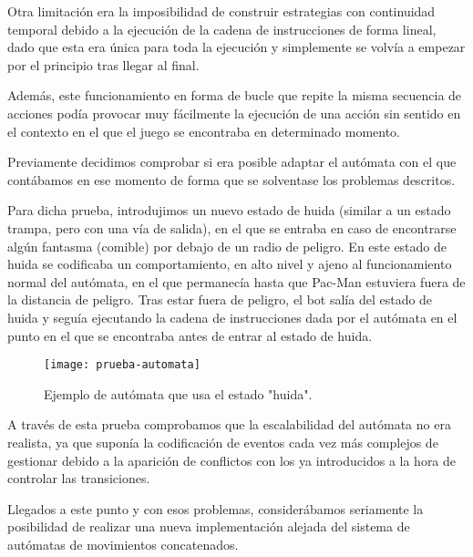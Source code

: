 Otra limitación era la imposibilidad de construir estrategias con continuidad temporal debido a la ejecución de la cadena de instrucciones de forma lineal, dado que esta era única para toda la ejecución y simplemente se volvía a empezar por el principio tras llegar al final.
 
Además, este funcionamiento en forma de bucle que repite la misma secuencia de acciones podía provocar muy fácilmente la ejecución de una acción sin sentido en el contexto en el que el juego se encontraba en determinado momento.
 
Previamente decidimos comprobar si era posible adaptar el autómata con el que contábamos en ese momento de forma que se solventase los problemas descritos.
 
Para dicha prueba, introdujimos un nuevo estado de huida (similar a un estado trampa, pero con una vía de salida), en el que se entraba en caso de encontrarse algún fantasma (comible) por debajo de un radio de peligro. 
En este estado de huida se codificaba un comportamiento, en alto nivel y ajeno al funcionamiento normal del autómata, en el que permanecía hasta que Pac-Man estuviera fuera de la distancia de peligro. Tras estar fuera de peligro, el bot salía del estado de huida y seguía ejecutando la cadena de instrucciones dada por el autómata en el punto en el que se encontraba antes de entrar al estado de huida.
\begin{figure}[H]
\centering
\texttt{[image: prueba-automata]}
\caption{Ejemplo de autómata que usa el estado "huida".}
\end{figure}

A través de esta prueba comprobamos que la escalabilidad del autómata no era realista, ya que suponía la codificación de eventos cada vez más complejos de gestionar debido a la aparición de conflictos con los ya introducidos a la hora de controlar las transiciones.
 
Llegados a este punto y con esos problemas, considerábamos seriamente la posibilidad de realizar una nueva implementación alejada del sistema de autómatas de movimientos concatenados.

